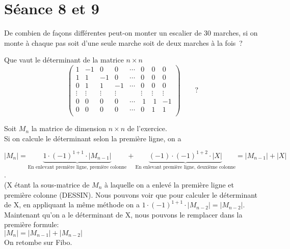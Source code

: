 \section{Séance 8 et 9}

\begin{exo}
De combien de fa\c{c}ons diff\'erentes peut-on monter un escalier de 30 marches, si on monte \`a chaque pas soit d'une seule marche soit de deux marches \`a la fois~?
\end{exo}

\begin{exo} 
Que vaut le d\'eterminant de la matrice $n \times n$ 
$$
\left( 
\begin{array}{rrrrrrrr}
1 &-1 &0  &0  &\cdots &0 &0 &0\\
1 & 1 &-1 &0  &\cdots &0 &0 &0\\
0 & 1 &1  &-1 &\cdots &0 &0 &0\\
\vdots & \vdots & \vdots & \vdots && \vdots & \vdots &\vdots\\
0 & 0 & 0 & 0 & \cdots & ~1 &~1 &-1\\
0 & 0 & 0 & 0 & \cdots & 0 &1 &1\\
\end{array}
\right) \qquad ?
$$
\end{exo}

Soit $M_n$ la matrice de dimension $n\times n$ de l'exercice.\\

Si on calcule le déterminant selon la première ligne, on a 

$$|M_n| = \underbrace{1\cdot (-1)^{1+1} \cdot |M_{n-1}|}_{\text{En enlevant première ligne, première colonne}} + \underbrace{(-1) \cdot (-1)^{1+2} \cdot |X|}_{\text{En enlevant première ligne, deuxième colonne}} = |M_{n-1}| + |X|$$. \\

(X étant la sous-matrice de $M_n$ à laquelle on a enlevé la première ligne et première colonne (DESSIN). Nous pouvons voir que pour calculer le déterminant de X, en appliquant la même méthode on a $1 \cdot (-1)^{1+1} \cdot |M_{n-2}| = |M_{n-2}|$.\\

Maintenant qu'on a le déterminant de X, nous pouvons le remplacer dans la première formule:\\

$|M_{n}| = |M_{n-1}| + |M_{n-2}|$\\

On retombe sur Fibo.

